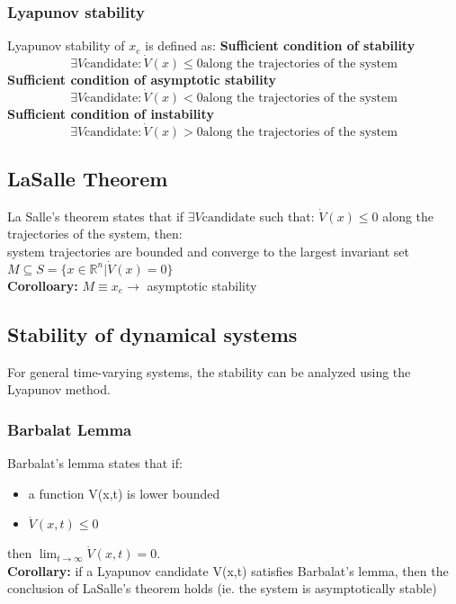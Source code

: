\documentclass[a4paper,12pt]{article}
\begin{document}
    \subsubsection{Lyapunov stability}
Lyapunov stability of $x_e$ is defined as:\newline
\textbf{Sufficient condition of stability}
\begin{equation}
    \exists V \text{candidate} : \dot{V}(x) \leq 0 \text{along the trajectories of the system}
\end{equation}
\textbf{Sufficient condition of asymptotic stability}
\begin{equation}
    \exists V \text{candidate} : \dot{V}(x) < 0 \text{along the trajectories of the system}
\end{equation}
\textbf{Sufficient condition of instability}
\begin{equation}
    \exists V \text{candidate} : \dot{V}(x) > 0 \text{along the trajectories of the system}
\end{equation}

\subsection{LaSalle Theorem}\label{sec:LaSalle Theorem}
La Salle's theorem states that if $\exists V \text{candidate}$ such 
that: $\dot{V}(x) \leq 0$ along the trajectories of the system, then:\\
system trajectories are bounded and converge to the largest invariant
set \\$M \subseteq S = \{x \in \mathbb{R}^n | \dot{V}(x) = 0\}$\\
\textbf{Corolloary:} $M \equiv {x_e} \rightarrow$ asymptotic stability

\subsection{Stability of dynamical systems}
For general time-varying systems, the stability can be analyzed using the Lyapunov method.
\subsubsection{Barbalat Lemma}
Barbalat's lemma states that if:
\begin{itemize}
    \item a function V(x,t) is lower bounded
    \item $\dot{V}(x,t) \leq 0$ 
\end{itemize}
then $\lim_{t \to \infty} \dot{V}(x,t) = 0$.\\
\textbf{Corollary:} if a Lyapunov candidate V(x,t) 
satisfies Barbalat's lemma, then the conclusion of 
LaSalle's theorem holds (ie. the system is asymptotically stable)
\end{document}
